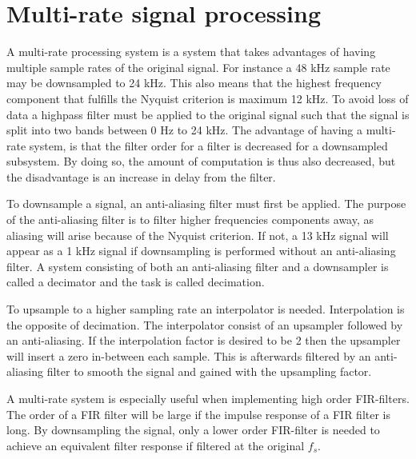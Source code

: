 \section{Multi-rate signal processing}

A multi-rate processing system is a system that takes advantages of having multiple sample rates of the original signal. For instance a 48 kHz sample rate may be downsampled to 24 kHz. This also means that the highest frequency component that fulfills the Nyquist criterion is maximum 12 kHz. To avoid loss of data a highpass filter must be applied to the original signal such that the signal is split into two bands between 0 Hz to 24 kHz. The advantage of having a multi-rate system, is that the filter order for a filter is decreased for a downsampled subsystem. By doing so, the amount of computation is thus also decreased, but the disadvantage is an increase in delay from the filter. 

To downsample a signal, an anti-aliasing filter must first be applied. The purpose of the anti-aliasing filter is to filter higher frequencies components away, as aliasing will arise because of the Nyquist criterion. If not, a 13 kHz signal will appear as a 1 kHz signal if downsampling is performed without an anti-aliasing filter. A system consisting of both an anti-aliasing filter and a downsampler is called a decimator and the task is called decimation.

To upsample to a higher sampling rate an interpolator is needed. Interpolation is the opposite of decimation. The interpolator consist of an upsampler followed by an anti-aliasing. If the interpolation factor is desired to be 2 then the upsampler will insert a zero in-between each sample. This is afterwards filtered by an anti-aliasing filter to smooth the signal and gained with the upsampling factor.  

A multi-rate system is especially useful when implementing high order FIR-filters. The order of a FIR filter will be large if the impulse response of a FIR filter is long. By downsampling the signal, only a lower order FIR-filter is needed to achieve an equivalent filter response if filtered at the original $f_s$.



